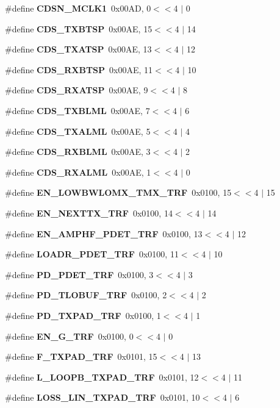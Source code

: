 \begin{DoxyCompactItemize}
\item 
\#define {\bf C\+D\+S\+N\+\_\+\+M\+C\+L\+K1}~0x00\+A\+D, 0$<$$<$4 $\vert$  0
\item 
\#define {\bf C\+D\+S\+\_\+\+T\+X\+B\+T\+SP}~0x00\+A\+E, 15$<$$<$4 $\vert$  14
\item 
\#define {\bf C\+D\+S\+\_\+\+T\+X\+A\+T\+SP}~0x00\+A\+E, 13$<$$<$4 $\vert$  12
\item 
\#define {\bf C\+D\+S\+\_\+\+R\+X\+B\+T\+SP}~0x00\+A\+E, 11$<$$<$4 $\vert$  10
\item 
\#define {\bf C\+D\+S\+\_\+\+R\+X\+A\+T\+SP}~0x00\+A\+E, 9$<$$<$4 $\vert$  8
\item 
\#define {\bf C\+D\+S\+\_\+\+T\+X\+B\+L\+ML}~0x00\+A\+E, 7$<$$<$4 $\vert$  6
\item 
\#define {\bf C\+D\+S\+\_\+\+T\+X\+A\+L\+ML}~0x00\+A\+E, 5$<$$<$4 $\vert$  4
\item 
\#define {\bf C\+D\+S\+\_\+\+R\+X\+B\+L\+ML}~0x00\+A\+E, 3$<$$<$4 $\vert$  2
\item 
\#define {\bf C\+D\+S\+\_\+\+R\+X\+A\+L\+ML}~0x00\+A\+E, 1$<$$<$4 $\vert$  0
\item 
\#define {\bf E\+N\+\_\+\+L\+O\+W\+B\+W\+L\+O\+M\+X\+\_\+\+T\+M\+X\+\_\+\+T\+RF}~0x0100, 15$<$$<$4 $\vert$  15
\item 
\#define {\bf E\+N\+\_\+\+N\+E\+X\+T\+T\+X\+\_\+\+T\+RF}~0x0100, 14$<$$<$4 $\vert$  14
\item 
\#define {\bf E\+N\+\_\+\+A\+M\+P\+H\+F\+\_\+\+P\+D\+E\+T\+\_\+\+T\+RF}~0x0100, 13$<$$<$4 $\vert$  12
\item 
\#define {\bf L\+O\+A\+D\+R\+\_\+\+P\+D\+E\+T\+\_\+\+T\+RF}~0x0100, 11$<$$<$4 $\vert$  10
\item 
\#define {\bf P\+D\+\_\+\+P\+D\+E\+T\+\_\+\+T\+RF}~0x0100, 3$<$$<$4 $\vert$  3
\item 
\#define {\bf P\+D\+\_\+\+T\+L\+O\+B\+U\+F\+\_\+\+T\+RF}~0x0100, 2$<$$<$4 $\vert$  2
\item 
\#define {\bf P\+D\+\_\+\+T\+X\+P\+A\+D\+\_\+\+T\+RF}~0x0100, 1$<$$<$4 $\vert$  1
\item 
\#define {\bf E\+N\+\_\+\+G\+\_\+\+T\+RF}~0x0100, 0$<$$<$4 $\vert$  0
\item 
\#define {\bf F\+\_\+\+T\+X\+P\+A\+D\+\_\+\+T\+RF}~0x0101, 15$<$$<$4 $\vert$  13
\item 
\#define {\bf L\+\_\+\+L\+O\+O\+P\+B\+\_\+\+T\+X\+P\+A\+D\+\_\+\+T\+RF}~0x0101, 12$<$$<$4 $\vert$  11
\item 
\#define {\bf L\+O\+S\+S\+\_\+\+L\+I\+N\+\_\+\+T\+X\+P\+A\+D\+\_\+\+T\+RF}~0x0101, 10$<$$<$4 $\vert$  6

\end{DoxyCompactItemize}
